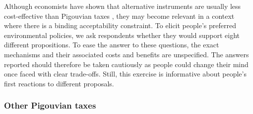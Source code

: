 \documentclass[english,5p,authoryear]{elsarticle}
\begin{document}
Although economists have shown that alternative instruments are usually less cost-effective than Pigouvian taxes \citep[e.g.][]{goulder_parry_2008}, they may become relevant in a context where there is a binding acceptability constraint. To elicit people's preferred environmental policies, we ask respondents whether they would support eight different propositions. To ease the answer to these questions, the exact mechanisms and their associated costs and benefits are unspecified. The answers reported should therefore be taken cautiously as people could change their mind once faced with clear trade-offs. Still, this exercise is informative about people's first reactions to different proposals.



        \subsubsection{Other Pigouvian taxes}
\end{document}
